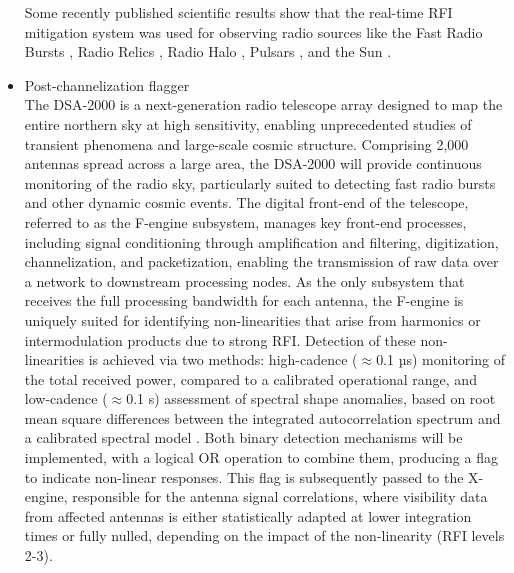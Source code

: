 \begin{itemize}
Some recently published scientific results show that the real-time RFI mitigation system was used for observing radio sources like the Fast Radio Bursts \citep{bethapudi2025rotation, bhardwaj2025constraining}, Radio Relics \citep{chatterjee2024new}, Radio Halo \citep{santra2024deep, manna2024radio}, Pulsars \citep{kumari2024first}, and the Sun \citep{mondal2025observation}.


\item Post-channelization flagger\\
The DSA-2000 is a next-generation radio telescope array designed to map the entire northern sky at high sensitivity, enabling unprecedented studies of transient phenomena and large-scale cosmic structure. Comprising 2,000 antennas spread across a large area, the DSA-2000 will provide continuous monitoring of the radio sky, particularly suited to detecting fast radio bursts and other dynamic cosmic events. The digital front-end of the telescope, referred to as the F-engine subsystem, manages key front-end processes, including signal conditioning through amplification and filtering, digitization, channelization, and packetization, enabling the transmission of raw data over a network to downstream processing nodes. As the only subsystem that receives the full processing bandwidth for each antenna, the F-engine is uniquely suited for identifying non-linearities that arise from harmonics or intermodulation products due to strong RFI. Detection of these non-linearities is achieved via two methods: high-cadence ($\approx$0.1 µs) monitoring of the total received power, compared to a calibrated operational range, and low-cadence ($\approx$0.1 s) assessment of spectral shape anomalies, based on root mean square differences between the integrated autocorrelation spectrum and a calibrated spectral model \citep{hellbourg2024flagging}. Both binary detection mechanisms will be implemented, with a logical OR operation to combine them, producing a flag to indicate non-linear responses. This flag is subsequently passed to the X-engine, responsible for the antenna signal correlations, where visibility data from affected antennas is either statistically adapted at lower integration times or fully nulled, depending on the impact of the non-linearity (RFI levels 2-3).
\end{itemize}

